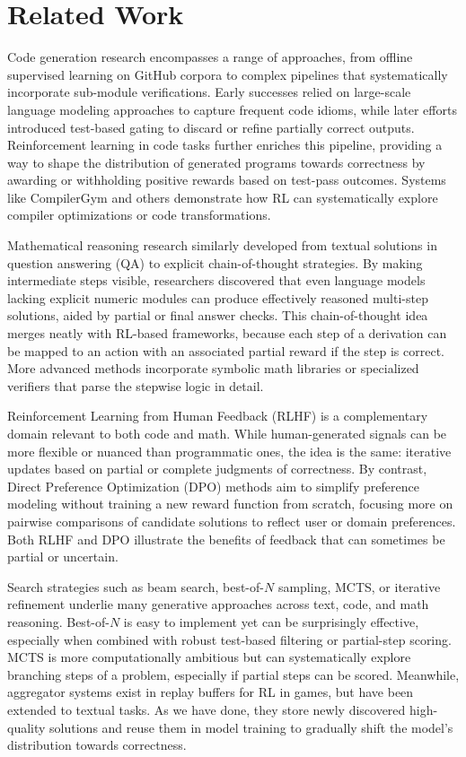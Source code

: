 \documentclass{article}
\begin{document}
\section{Related Work}
Code generation research encompasses a range of approaches, from offline supervised learning on GitHub corpora to complex pipelines that systematically incorporate sub-module verifications. Early successes relied on large-scale language modeling approaches to capture frequent code idioms, while later efforts introduced test-based gating to discard or refine partially correct outputs. Reinforcement learning in code tasks further enriches this pipeline, providing a way to shape the distribution of generated programs towards correctness by awarding or withholding positive rewards based on test-pass outcomes. Systems like CompilerGym and others demonstrate how RL can systematically explore compiler optimizations or code transformations.

Mathematical reasoning research similarly developed from textual solutions in question answering (QA) to explicit chain-of-thought strategies. By making intermediate steps visible, researchers discovered that even language models lacking explicit numeric modules can produce effectively reasoned multi-step solutions, aided by partial or final answer checks. This chain-of-thought idea merges neatly with RL-based frameworks, because each step of a derivation can be mapped to an action with an associated partial reward if the step is correct. More advanced methods incorporate symbolic math libraries or specialized verifiers that parse the stepwise logic in detail.

Reinforcement Learning from Human Feedback (RLHF) is a complementary domain relevant to both code and math. While human-generated signals can be more flexible or nuanced than programmatic ones, the idea is the same: iterative updates based on partial or complete judgments of correctness. By contrast, Direct Preference Optimization (DPO) methods aim to simplify preference modeling without training a new reward function from scratch, focusing more on pairwise comparisons of candidate solutions to reflect user or domain preferences. Both RLHF and DPO illustrate the benefits of feedback that can sometimes be partial or uncertain.

Search strategies such as beam search, best-of-\(N\) sampling, MCTS, or iterative refinement underlie many generative approaches across text, code, and math reasoning. Best-of-\(N\) is easy to implement yet can be surprisingly effective, especially when combined with robust test-based filtering or partial-step scoring. MCTS is more computationally ambitious but can systematically explore branching steps of a problem, especially if partial steps can be scored. Meanwhile, aggregator systems exist in replay buffers for RL in games, but have been extended to textual tasks. As we have done, they store newly discovered high-quality solutions and reuse them in model training to gradually shift the model’s distribution towards correctness.
\end{document}
